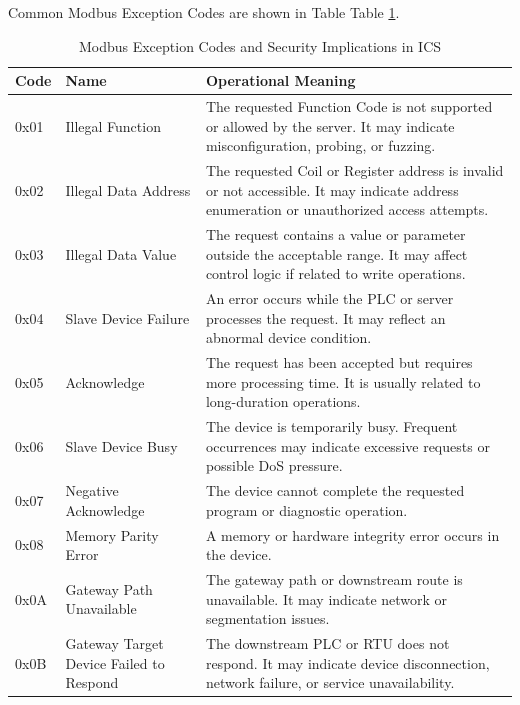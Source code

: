 Common Modbus Exception Codes are shown in Table Table \ref{tab:modbus_exception}.
\begin{table}[htbp]
\caption{Modbus Exception Codes and Security Implications in ICS}
\centering
\small
\renewcommand{\arraystretch}{1.25}
\setlength{\tabcolsep}{4pt}
\begin{tabularx}{\textwidth}{@{} p{1.0cm} p{3.6cm} X @{}}
\toprule
\textbf{Code} & \textbf{Name} & \textbf{Operational Meaning} \\
\midrule

0x01 & Illegal Function &
The requested Function Code is not supported or allowed by the server. It may indicate misconfiguration, probing, or fuzzing. \\
\addlinespace

0x02 & Illegal Data Address &
The requested Coil or Register address is invalid or not accessible. It may indicate address enumeration or unauthorized access attempts. \\
\addlinespace

0x03 & Illegal Data Value &
The request contains a value or parameter outside the acceptable range. It may affect control logic if related to write operations. \\
\addlinespace

0x04 & Slave Device Failure &
An error occurs while the PLC or server processes the request. It may reflect an abnormal device condition. \\
\addlinespace

0x05 & Acknowledge &
The request has been accepted but requires more processing time. It is usually related to long-duration operations. \\
\addlinespace

0x06 & Slave Device Busy &
The device is temporarily busy. Frequent occurrences may indicate excessive requests or possible DoS pressure. \\
\addlinespace

0x07 & Negative \newline Acknowledge &
The device cannot complete the requested program or diagnostic operation. \\
\addlinespace

0x08 & Memory Parity Error &
A memory or hardware integrity error occurs in the device. \\
\addlinespace

0x0A & Gateway Path \newline Unavailable &
The gateway path or downstream route is unavailable. It may indicate network or segmentation issues. \\
\addlinespace

0x0B & Gateway Target \newline Device Failed to \newline Respond &
The downstream PLC or RTU does not respond. It may indicate device disconnection, network failure, or service unavailability. \\

\bottomrule
\end{tabularx}
\label{tab:modbus_exception}
\end{table}

